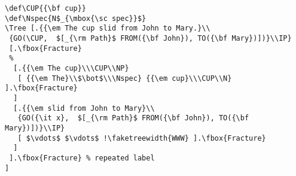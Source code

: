 \documentclass[11pt]{article}
\begin{document}
{\small
\begin{verbatim}
\def\CUP{{\bf cup}}
\def\Nspec{N$_{\mbox{\sc spec}}$}
\Tree [.{{\em The cup slid from John to Mary.}\\
 {GO(\CUP,  $[_{\rm Path}$ FROM({\bf John}), TO({\bf Mary})])}\\IP}
 [.\fbox{Fracture}
 %
  [.{{\em The cup}\\\CUP\\NP}
   [ {{\em The}\\$\bot$\\\Nspec} {{\em cup}\\\CUP\\N} ].\fbox{Fracture}
  ]
  [.{{\em slid from John to Mary}\\
   {GO({\it x},  $[_{\rm Path}$ FROM({\bf John}), TO({\bf Mary})])}\\IP}
   [ $\vdots$ $\vdots$ !\faketreewidth{WWW} ].\fbox{Fracture}
  ]
 ].\fbox{Fracture} % repeated label
]
\end{verbatim}} %
\end{document}
